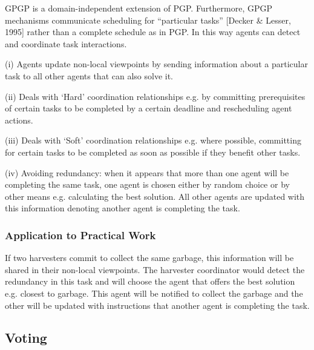 GPGP is a domain-independent extension of PGP. Furthermore, GPGP mechanisms communicate scheduling for ``particular tasks'' [Decker \& Lesser, 1995] rather than a complete schedule as in PGP. In this way agents can detect and coordinate task interactions. 

(i) Agents update non-local viewpoints by sending information about a particular task to all other agents that can also solve it.

(ii) Deals with ‘Hard’ coordination relationships e.g. by committing prerequisites of certain tasks to be completed by a certain deadline and rescheduling agent actions. 

(iii) Deals with ‘Soft’ coordination relationships e.g. where possible, committing for certain tasks to be completed as soon as possible if they benefit other tasks. 

(iv) Avoiding redundancy:  when it appears that more than one agent will be completing the same task, one agent is chosen either by random choice or by other means e.g. calculating the best solution. All other agents are updated with this information denoting another agent is completing the task. 

\subsubsection{Application to Practical Work}

If two harvesters commit to collect the same garbage, this information will be shared in their non-local viewpoints. The harvester coordinator would detect the redundancy in this task and will choose the agent that offers the best solution e.g. closest to garbage.  This agent will be notified to collect the garbage and the other will be updated with instructions that another agent is completing the task. 

\subsection{Voting}

